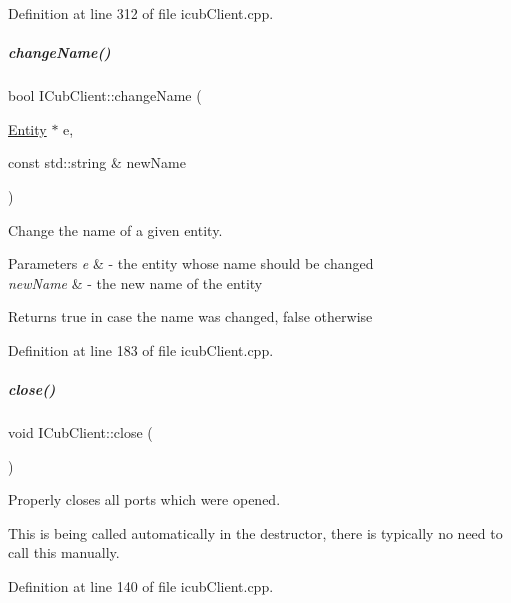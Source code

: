 Definition at line 312 of file icub\+Client.\+cpp.

\mbox{\label{group__icubclient__clients_a860fb1399bafb125c3955110dc17a42e}} 
\subparagraph{\texorpdfstring{change\+Name()}{changeName()}}
{\footnotesize\ttfamily bool I\+Cub\+Client\+::change\+Name (\begin{DoxyParamCaption}\item[{\hyperlink{group__icubclient__representations_classicubclient_1_1Entity}{Entity} $\ast$}]{e,  }\item[{const std\+::string \&}]{new\+Name }\end{DoxyParamCaption})}



Change the name of a given entity. 


\begin{DoxyParams}{Parameters}
{\em e} & -\/ the entity whose name should be changed \\
\hline
{\em new\+Name} & -\/ the new name of the entity \\
\hline
\end{DoxyParams}
\begin{DoxyReturn}{Returns}
true in case the name was changed, false otherwise 
\end{DoxyReturn}


Definition at line 183 of file icub\+Client.\+cpp.

\mbox{\label{group__icubclient__clients_a928939e68435d8f143883675eb0183af}} 
\subparagraph{\texorpdfstring{close()}{close()}}
{\footnotesize\ttfamily void I\+Cub\+Client\+::close (\begin{DoxyParamCaption}{ }\end{DoxyParamCaption})}



Properly closes all ports which were opened. 

This is being called automatically in the destructor, there is typically no need to call this manually. 

Definition at line 140 of file icub\+Client.\+cpp.

